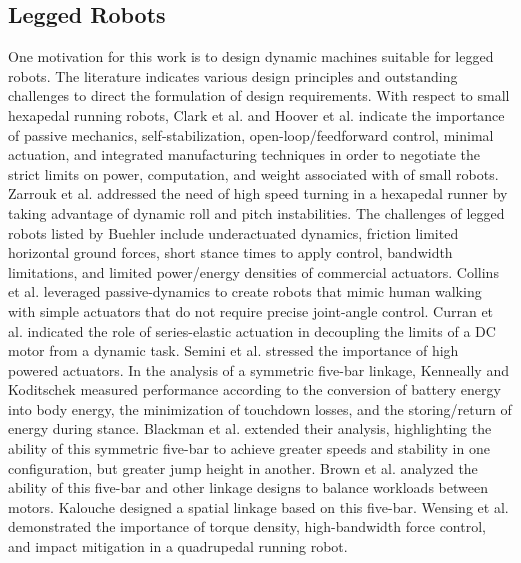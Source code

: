 \documentclass[journal]{IEEEtran}
\begin{document}
%
%
%
%
%


\subsection{Legged Robots}
\label{sec:leg_rob}


One motivation for this work is to design dynamic machines suitable for legged robots.
The literature indicates various design principles and outstanding challenges to direct the formulation of design requirements.
With respect to small hexapedal running robots, Clark et al. \cite{clarkBiomimeticDesignFabrication2001} and Hoover et al. \cite{hooverBioinspiredDesignDynamic2010} indicate the importance of passive mechanics, self-stabilization, open-loop/feedforward control, minimal actuation, and integrated manufacturing techniques in order to negotiate the strict limits on power, computation, and weight associated with of small robots.
Zarrouk et al. \cite{zarroukDynamicLeggedLocomotion2015} addressed the need of high speed turning in a hexapedal runner by taking advantage of dynamic roll and pitch instabilities.
The challenges of legged robots listed by Buehler \cite{buehlerDynamicLocomotionOne2002} include underactuated dynamics, friction limited horizontal ground forces, short stance times to apply control, bandwidth limitations, and limited power/energy densities of commercial actuators.
Collins et al. \cite{collinsEfficientBipedalRobots2005} leveraged passive-dynamics to create robots that mimic human walking with simple actuators that do not require precise joint-angle control.
Curran et al. \cite{curranDesignSeriesElasticActuators2008} indicated the role of series-elastic actuation in decoupling the limits of a DC motor from a dynamic task.
Semini et al. \cite{seminiDesignHyQHydraulically2011} stressed the importance of high powered actuators.
In the analysis of a symmetric five-bar linkage, Kenneally and Koditschek \cite{kenneallyLegDesignEnergy2015} measured performance according to the conversion of battery energy into body energy, the minimization of touchdown losses, and the storing/return of energy during stance.
Blackman et al. \cite{blackmanLegDesignRunning2017} extended their analysis, highlighting the ability of this symmetric five-bar to achieve greater speeds and stability in one configuration, but greater jump height in another.
Brown et al. \cite{brownDesignMethodologyLinkage2017} analyzed the ability of this five-bar and other linkage designs to balance workloads between motors.
Kalouche \cite{kaloucheGOATLeggedRobot2017} designed a spatial linkage based on this five-bar.
Wensing et al. \cite{wensingProprioceptiveActuatorDesign2017} demonstrated the importance of torque density, high-bandwidth force control, and impact mitigation in a quadrupedal running robot.
\end{document}
